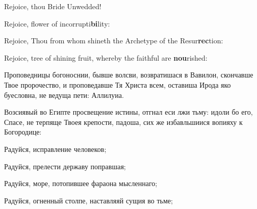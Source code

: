 
Rejoice, thou Bride Unwedded!





\PeopleRejoice Rejoice, flower of incorrupti\textbf{bi}lity:


Rejoice, Thou from whom shineth the Archetype of the Resur\textbf{rec}tion:


Rejoice, tree of shining fruit, whereby the faithful are \textbf{nou}rished:


\pagebreak


\Ierei Проповедницы богоноснии, бывше волсви, возвратишася в Вавилон, скончавше Твое пророчество, и проповедавше Тя Христа всем, оставиша Ирода яко буесловна, не ведуща пети: Аллилуиа.


\Ierei Возсиявый во Египте просвещение истины, отгнал еси лжи тьму: идоли бо его, Спасе, не терпяще Твоея крепости, падоша, сих же избавльшиися вопияху к Богородице:

Радуйся, исправление человеков;


Радуйся, прелести державу поправшая;


Радуйся, море, потопившее фараона мысленнаго;


Радуйся, огненный столпе, наставляяй сущия во тьме;

